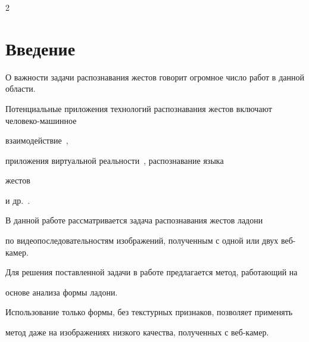 









      \thispagestyle{headings}





      \begin{multicols}{2}





            \label{st\stat}





\section{Введение}\label{sec:introduction}





О важности задачи распознавания жестов говорит огромное число работ в данной области.


Потенциальные приложения технологий распознавания жестов включают че\-ло\-ве\-ко-ма\-шин\-ное 


взаимодействие~\cite{BareHand3d2006},


приложения виртуальной реальности~\cite{GaVeDi}, распознавание языка 


жестов~\cite{GestureRecognitionVisapp2007} 


и др.~\cite{GestureRecognitionSurvey, VisionBasedReview2009}.





В данной работе рассматривается задача распознавания жестов ладони 


по видеопоследовательностям изображений, полученным с одной или двух веб-ка\-мер.


Для решения поставленной задачи в работе предлагается метод, работающий на 


основе анализа формы ладони.


Использование только формы, без текстурных признаков, позволяет применять 


метод даже на изображениях низкого качества, полученных с веб-камер.






\end{multicols}
